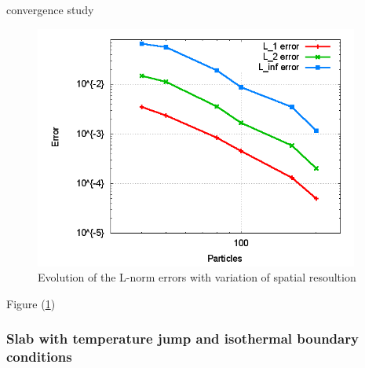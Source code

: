 \documentclass{report}
\begin{document}
convergence study

\begin{figure}[h]  
  \label{fig:PureHeat_ErrorResolution}
  \centering
  \includegraphics[width=0.95\textwidth]{Graphics/results/PureHeatConduction/ErrorResolution}
  \caption{Evolution of the L-norm errors with variation of spatial resoultion}
\end{figure}
Figure (\ref{fig:PureHeat_ErrorResolution})




\subsubsection{Slab with temperature jump and isothermal boundary conditions}
\label{sec:pureHeat_Results_isothermal_slab}
\end{document}
